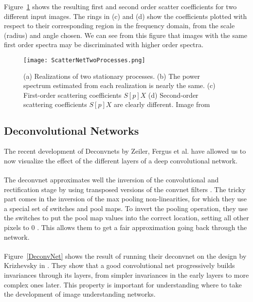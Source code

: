 \documentclass[12pt, a4paper, oneside, english]{article}
\begin{document}
Figure~\ref{ScatterNet} shows the resulting first and second order scatter coefficients for two different input images. The rings in (c) and (d) show the coefficients plotted with respect to their corresponding region in the frequency domain, from the scale (radius) and angle chosen. We can see from this figure that images with the same first order spectra may be discriminated with higher order spectra.
\begin{figure}
\centering
\texttt{[image: ScatterNetTwoProcesses.png]}
\caption{(a) Realizations of two stationary processes. (b) The power spectrum estimated from each realization is nearly the same. (c) First-order scattering coefficients $S[p]X$ (d) Second-order scattering coefficients $S[p]X$ are clearly different. Image from \cite{bruna_invariant_2013} }
\label{ScatterNet}
\end{figure}
\subsection{Deconvolutional Networks}
The recent development of Deconvnets by Zeiler, Fergus et al. \cite{zeiler_adaptive_2011, zeiler_visualizing_compact_2014} have allowed us to now visualize the effect of the different layers of a deep convolutional network. \\\\
The deconvnet approximates well the inversion of the convolutional and rectification stage by using transposed versions of the convnet filters \cite{zeiler_visualizing_compact_2014}. The tricky part comes in the inversion of the max pooling non-linearities, for which they use a special set of switches and pool maps. To invert the pooling operation, they use the switches to put the pool map values into the correct location, setting all other pixels to 0 \cite{zeiler_adaptive_2011}. This allows them to get a fair approximation going back through the network.\\\\
Figure~\ref{DeconvNet} shows the result of running their deconvnet on the design by Krizhevsky in \cite{krizhevsky_imagenet_2012}. They show that a good convolutional net progressively builds invariances through its layers, from simpler invariances in the early layers to more complex ones later. This property is important for understanding where to take the development of image understanding networks.

\end{document}
